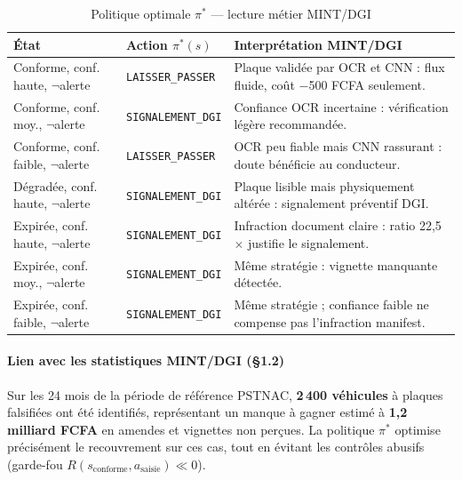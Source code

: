 \begin{table}[H]
\centering
\caption{Politique optimale $\pi^*$ --- lecture m\'{e}tier MINT/DGI}
\label{tab:c:metier}
\begin{tabular}{p{4.2cm}lp{6cm}}
\toprule
\textbf{\'{E}tat} & \textbf{Action $\pi^*(s)$} & \textbf{Interpr\'{e}tation MINT/DGI} \\
\midrule
Conforme, conf. haute, $\neg$alerte
  & \texttt{LAISSER\_PASSER}
  & Plaque valid\'{e}e par OCR et CNN : flux fluide, co\^{u}t $-$500 FCFA seulement. \\
Conforme, conf. moy., $\neg$alerte
  & \texttt{SIGNALEMENT\_DGI}
  & Confiance OCR incertaine : v\'{e}rification l\'{e}g\`{e}re recommand\'{e}e. \\
Conforme, conf. faible, $\neg$alerte
  & \texttt{LAISSER\_PASSER}
  & OCR peu fiable mais CNN rassurant : doute b\'{e}n\'{e}ficie au conducteur. \\
D\'{e}grad\'{e}e, conf. haute, $\neg$alerte
  & \texttt{SIGNALEMENT\_DGI}
  & Plaque lisible mais physiquement alt\'{e}r\'{e}e : signalement pr\'{e}ventif DGI. \\
Expir\'{e}e, conf. haute, $\neg$alerte
  & \texttt{SIGNALEMENT\_DGI}
  & Infraction document claire : ratio 22{,}5$\times$ justifie le signalement. \\
Expir\'{e}e, conf. moy., $\neg$alerte
  & \texttt{SIGNALEMENT\_DGI}
  & M\^{e}me strat\'{e}gie : vignette manquante d\'{e}tect\'{e}e. \\
Expir\'{e}e, conf. faible, $\neg$alerte
  & \texttt{SIGNALEMENT\_DGI}
  & M\^{e}me strat\'{e}gie ; confiance faible ne compense pas l'infraction manifest. \\
\bottomrule
\end{tabular}
\end{table}

\paragraph{Lien avec les statistiques MINT/DGI (§1.2)}
Sur les 24 mois de la p\'{e}riode de r\'{e}f\'{e}rence PSTNAC, \textbf{2\,400 v\'{e}hicules}
\`{a} plaques falsifi\'{e}es ont \'{e}t\'{e} identifi\'{e}s, repr\'{e}sentant un manque
\`{a} gagner estim\'{e} \`{a} \textbf{1{,}2 milliard FCFA} en amendes et vignettes
non per\c{c}ues. La politique $\pi^*$ optimise pr\'{e}cis\'{e}ment le recouvrement
sur ces cas, tout en \'{e}vitant les contr\^{o}les abusifs (garde-fou
$R(s_{\text{conforme}}, a_{\text{saisie}}) \ll 0$).

